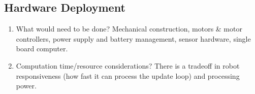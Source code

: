\documentclass[10pt,journal,compsoc]{IEEEtran}
\begin{document}
\subsection{Hardware Deployment}
\begin{enumerate}
\item What would need to be done?
Mechanical construction, motors \& motor controllers, power supply and battery management, sensor hardware, single board computer.
\item Computation time/resource considerations?
There is a tradeoff in robot responsiveness (how fast it can process the update loop) and processing power.
\end{enumerate}
\end{document}
